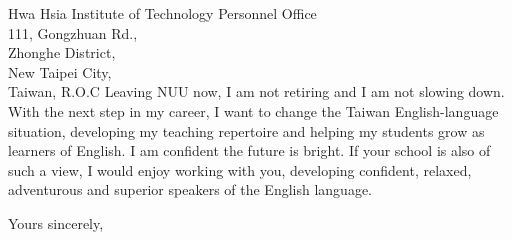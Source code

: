 \documentclass{letter}
\begin{document}
\begin{letter}{
Hwa Hsia Institute of Technology Personnel Office \\ 111, Gongzhuan Rd., \\ Zhonghe District, \\ New Taipei City, \\ Taiwan, R.O.C}
Leaving NUU now, I am not retiring and I am not slowing down. With the next step in my career, I want to change the Taiwan English-language situation, developing my teaching repertoire and helping my students grow as learners of English. I am confident the future is bright. If your school is also of such a view, I would enjoy working with you, developing confident, relaxed, adventurous and superior speakers of the English language.

\closing{Yours sincerely,}


\end{letter}
\end{document}
